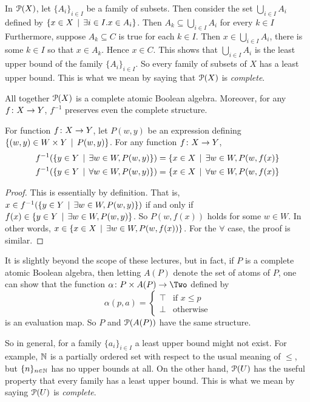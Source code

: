 In ${\mathcal{P}}(X)$, let $\{A_i\}_{i\in I}$ be a family of subsets.
Then consider the set $\bigcup_{i\in I}A_i $ defined by $\{x\in X\,\mid\, \exists i\in I. x\in A_i\}$. Then $A_k\subseteq \bigcup_{i\in I}A_i$ for every $k\in I$
Furthermore, suppose $A_k\subseteq C$ is true for each $k\in I$.
Then $x\in \bigcup_{i\in I}A_i$, there is some $k\in I$ so that $x\in A_k$.
Hence $x\in C$.
This shows that $\bigcup_{i\in I}A_i$ is the least upper bound of the family $\{A_i\}_{i\in I}$.
So every family of subsets of $X$ has a least upper bound.
This is what we mean by saying that ${\mathcal{P}}(X)$ is \emph{complete}.

All together ${\mathcal{P}}(X)$ is a complete atomic Boolean algebra. Moreover,
for any ${f}\colon{X}\to{Y}$, 
$f^{-1}$ preserves even the complete structure.

\begin{lemma}
	For function ${f}\colon{X}\to{Y}$, let $P(w,y)$ be an expression defining
	$\{(w,y)\in W\times Y\,\mid\, P(w,y)\}$. For any function ${f}\colon{X}\to{Y}$,
	\begin{align*}
	f^{-1}(\{y\in Y\,\mid\, \exists w\in W, P(w,y)\}) &= \{x\in X\,\mid\, \exists w\in W, P(w,f(x)\}\\
	f^{-1}(\{y\in Y\,\mid\, \forall w\in W, P(w,y)\}) &= \{x\in X\,\mid\, \forall w\in W, P(w,f(x)\}\\
	\end{align*}
	
	\begin{proof}
		This is essentially by definition. That is, $x\in f^{-1}(\{y\in Y\,\mid\, \exists w\in W, P(w,y)\})$ if and only if $f(x)\in \{y\in Y\,\mid\, \exists w\in W,P(w,y)\}$. So $P(w,f(x))$ holds for some $w\in W$. In other words, 
		$x\in \{x\in X\,\mid\, \exists w\in W,P(w,f(x))\}$.
		For the $\forall$ case, the proof is similar.
	\end{proof} 
\end{lemma}

It is slightly beyond the scope of these lectures, but in fact, if $P$ is
a complete atomic Boolean algebra, then letting $A(P)$ denote the set of atoms of $P$, one can show that the function $\fromto \alpha {P\times A(P)}\Two$ defined 
by \[\alpha(p,a) = \begin{cases}
\top & \text{if $x\leq p$}\\
\bot & \text{otherwise}
\end{cases}
\]
is an evaluation map. So $P$ and ${\mathcal{P}}(A(P))$ have the same structure. 

So in general, for a family $\{a_i\}_{i\in I}$ a least upper bound might not exist.
For example, $\mathbb N$ is a partially ordered set with respect to the usual meaning of $\leq$, but $\{n\}_{n\in \mathbb N}$ has no upper bounds at all.
On the other hand, ${\mathcal{P}}(U)$ has the useful property that every family has a least upper bound.
This is what we mean by saying ${\mathcal{P}}(U)$ is \emph{complete}. 

